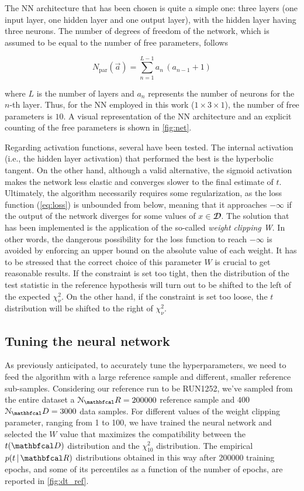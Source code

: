 The NN architecture that has been chosen is quite a simple one: three layers (one input layer, one hidden layer and one
output layer), with the hidden layer having three neurons. The number of degrees of freedom of the network, which is
assumed to be equal to the number of free parameters, follows 

\begin{equation}
    N_{\text{par}}(\vec{a})=\sum_{n=1}^{L-1} a_n \, (a_{n-1} + 1)
\end{equation}

\noindent where $L$ is the number of layers and $a_n$ represents the number of neurons for the $n$-th layer. Thus, for
the NN employed in this work ($1 \times 3 \times 1$), the number of free parameters is $10$. A visual representation of
the NN architecture and an explicit counting of the free parameters is shown in \autoref{fig:net}. 

Regarding activation functions, several have been tested. The internal activation (i.e., the hidden layer activation)
that performed the best is the hyperbolic tangent. On the other hand, although a valid alternative, the sigmoid
activation makes the network less elastic and converges slower to the final estimate of $t$. 
Ultimately, the algorithm necessarily requires some regularization, as the loss function (\ref{eq:loss}) is unbounded
from below, meaning that it approaches $-\infty$ if the output of the network diverges for some values of
$x\in\mathbfcal{D}$. The solution that has been implemented is the application of the so-called \textit{weight clipping
W}. In other words, the dangerous possibility for the loss function to reach $-\infty$ is avoided by enforcing an upper
bound on the absolute value of each weight. It has to be stressed that the correct choice of this parameter $W$ is
crucial to get reasonable results. If the constraint is set too tight, then the distribution of the test statistic in
the reference hypothesis will turn out to be shifted to the left of the expected $\chi^2_{\nu}$. On the other hand, if
the constraint is set too loose, the $t$ distribution will be shifted to the right of $\chi^2_{\nu}$. 

\subsection{Tuning the neural network}

As previously anticipated, to accurately tune the hyperparameters, we need to feed the algorithm with a large reference
sample and different, smaller reference sub-samples. Considering our reference run to be RUN1252, we've sampled from the
entire dataset a $\mathcal{N}_\R = 200000$ reference sample and $400$ $\mathcal{N}_\D = 3000$ data samples. For
different values of the weight clipping parameter, ranging from 1 to 100, we have trained the neural network and
selected the $W$ value that maximizes the compatibility between the $t(\D)$ distribution and the $\chi^2_{10}$
distribution. The empirical $p(t\,|\,\R)$ distributions obtained in this way after 200000 training epochs, and some of
its percentiles as a function of the number of epochs, are reported in \autoref{fig:dt_ref}.


